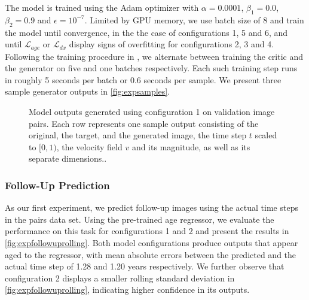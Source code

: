 The model is trained using the Adam optimizer with $\alpha = 0.0001$, $\beta_1 = 0.0$, $\beta_2 = 0.9$ and $\epsilon = 10^{-7}$. Limited by GPU memory, we use batch size of 8 and train the model until convergence, in the the case of configurations 1, 5 and 6, and until $\mathcal{L}_{age}$ or $\mathcal{L}_{dx}$ display signs of overfitting for configurations 2, 3 and 4. Following the training procedure in \cite{goodfellow2014generative}, we alternate between training the critic and the generator on five and one batches respectively. Each such training step runs in roughly 5 seconds per batch or 0.6 seconds per sample. We present three sample generator outputs in \autoref{fig:expsamples}.

\begin{figure}
	\centering
	
	\vspace*{-15pt}
	\caption{Model outputs generated using configuration 1 on validation image pairs. Each row represents one sample output consisting of the original, the target, and the generated image, the time step $t$ scaled to $[0, 1)$, the velocity field $v$ and its magnitude, as well as its separate dimensions..}
	\label{fig:expsamples}
\end{figure}

\subsubsection*{Follow-Up Prediction}
As our first experiment, we predict follow-up images using the actual time steps in the pairs data set. Using the pre-trained age regressor, we evaluate the performance on this task for configurations 1 and 2 and present the results in \autoref{fig:expfollowuprolling}. Both model configurations produce outputs that appear aged to the regressor, with mean absolute errors between the predicted and the actual time step of 1.28 and 1.20 years respectively. We further observe that configuration 2 displays a smaller rolling standard deviation in \autoref{fig:expfollowuprolling}, indicating higher confidence in its outputs.

